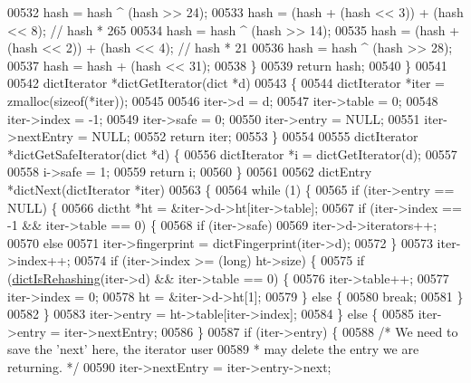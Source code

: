 \begin{DoxyCode}
00532         hash = hash ^ (hash >> 24);
00533         hash = (hash + (hash << 3)) + (hash << 8); \textcolor{comment}{// hash * 265}
00534         hash = hash ^ (hash >> 14);
00535         hash = (hash + (hash << 2)) + (hash << 4); \textcolor{comment}{// hash * 21}
00536         hash = hash ^ (hash >> 28);
00537         hash = hash + (hash << 31);
00538     \}
00539     \textcolor{keywordflow}{return} hash;
00540 \}
00541 
00542 dictIterator *dictGetIterator(dict *d)
00543 \{
00544     dictIterator *iter = zmalloc(\textcolor{keyword}{sizeof}(*iter));
00545 
00546     iter->d = d;
00547     iter->table = 0;
00548     iter->index = -1;
00549     iter->safe = 0;
00550     iter->entry = NULL;
00551     iter->nextEntry = NULL;
00552     \textcolor{keywordflow}{return} iter;
00553 \}
00554 
00555 dictIterator *dictGetSafeIterator(dict *d) \{
00556     dictIterator *i = dictGetIterator(d);
00557 
00558     i->safe = 1;
00559     \textcolor{keywordflow}{return} i;
00560 \}
00561 
00562 dictEntry *dictNext(dictIterator *iter)
00563 \{
00564     \textcolor{keywordflow}{while} (1) \{
00565         \textcolor{keywordflow}{if} (iter->entry == NULL) \{
00566             dictht *ht = &iter->d->ht[iter->table];
00567             \textcolor{keywordflow}{if} (iter->index == -1 && iter->table == 0) \{
00568                 \textcolor{keywordflow}{if} (iter->safe)
00569                     iter->d->iterators++;
00570                 \textcolor{keywordflow}{else}
00571                     iter->fingerprint = dictFingerprint(iter->d);
00572             \}
00573             iter->index++;
00574             \textcolor{keywordflow}{if} (iter->index >= (\textcolor{keywordtype}{long}) ht->size) \{
00575                 \textcolor{keywordflow}{if} (\hyperlink{dict_8h_aa6e4917a6a32fdf47180e03ed8969e02}{dictIsRehashing}(iter->d) && iter->table == 0) \{
00576                     iter->table++;
00577                     iter->index = 0;
00578                     ht = &iter->d->ht[1];
00579                 \} \textcolor{keywordflow}{else} \{
00580                     \textcolor{keywordflow}{break};
00581                 \}
00582             \}
00583             iter->entry = ht->table[iter->index];
00584         \} \textcolor{keywordflow}{else} \{
00585             iter->entry = iter->nextEntry;
00586         \}
00587         \textcolor{keywordflow}{if} (iter->entry) \{
00588             \textcolor{comment}{/* We need to save the 'next' here, the iterator user}
00589 \textcolor{comment}{             * may delete the entry we are returning. */}
00590             iter->nextEntry = iter->entry->next;

\end{DoxyCode}
